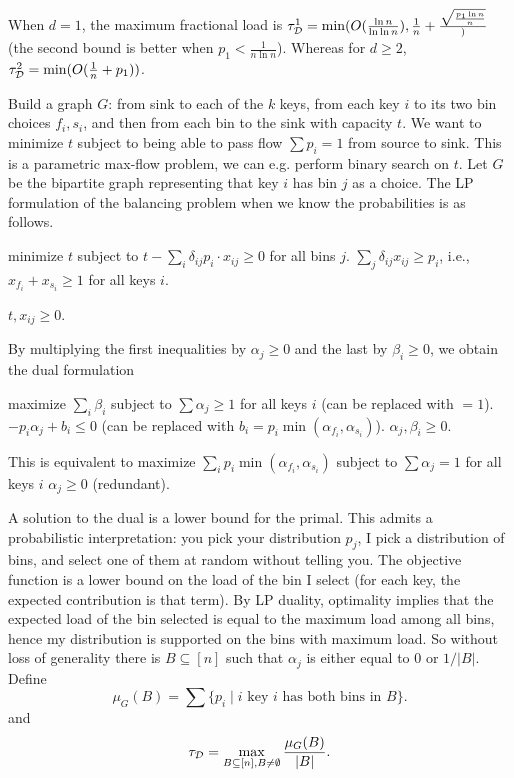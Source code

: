 \documentclass[10pt,conference,letterpaper]{IEEEtran}
\begin{document}
{When $d = 1$, the maximum fractional load is $\tau_{\mathcal D}^1 = \min(O(\frac{\ln n}{\ln \ln n}), \frac{1}{n} + \frac{\sqrt{\frac{p_1 \ln n}{n}}})$
        (the second bound is better when $p_1 < \frac{1}{n \ln n}$).
        Whereas for $d \ge 2$, $\tau_{\mathcal D}^2 = \min(O(\frac{1}{n} + p_1))$.

Build a graph $G$: from sink to each of the $k$ keys, from each key $i$ to its two bin choices $f_i, s_i$, and then from each bin to the sink with
capacity $t$. We want to minimize $t$ subject to being able to pass flow $\sum p_i = 1$ from source to sink. This is a parametric max-flow problem, we
can e.g. perform binary search on $t$.
Let $G$ be the bipartite graph representing that key $i$ has bin $j$ as a choice.
The LP formulation of the balancing problem when we know the probabilities is as follows.

minimize $t$
subject to $t - \sum_i \delta_{ij} p_i \cdot x_{ij} \ge 0$ for all bins $j$.
           $\sum_j \delta_{ij} x_{ij} \ge p_i$, i.e.,
           $x_{f_i} + x_{s_i} \ge 1$ for all keys $i$.

           $t, x_{ij} \ge 0$.

By multiplying the first inequalities by $\alpha_j \ge 0$ and the last by $\beta_i \ge 0$, we obtain the dual formulation

maximize $\sum_i \beta_i$
subject to
        $\sum \alpha_j \ge 1$ for all keys $i$ (can be replaced with $ = 1$).
        $-p_i \alpha_j + b_i \le 0$ (can be replaced with $b_i = p_i \min(\alpha_{f_i}, \alpha_{s_i})$).
        $\alpha_j, \beta_i \ge 0$.

This is equivalent to
maximize $\sum_i p_i \min(\alpha_{f_i}, \alpha_{s_i})$
subject to
        $\sum \alpha_j = 1$ for all keys $i$
        $\alpha_j \ge 0$ (redundant).

A solution to the dual is a lower bound for the primal. This admits a probabilistic interpretation: you pick your distribution $p_j$, I pick a
distribution of bins, and select one of them at random without telling you. The objective function is a lower bound on the load of the bin I select
(for each key, the expected contribution is that term). By LP duality, optimality implies that the expected load of the bin selected is equal to the
maximum load among all bins, hence my distribution is supported on the bins with maximum load. So without loss of generality there is $B \subseteq
[n]$ such that $\alpha_j$ is either equal to $0$ or $1/|B|$.
Define
$$ \mu_G(B) = \sum \{ p_i \mid i \text { key $i$ has both bins in } B \}. $$
and
$$ \tau_{\mathcal D} = \max_{B \subseteq [n], B \neq \emptyset} \frac{\mu_G(B)}{|B|}. $$


}
\end{document}
